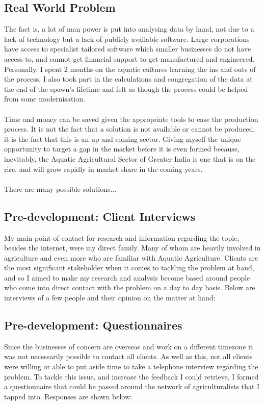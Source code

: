 \documentclass[a4paper,11pt]{proc}
\begin{document}
\subsection{Real World Problem}
The fact is, a lot of man power is put into analysing data by hand, not due to a lack of technology but a lack of publicly available software. Large corporations have access to specialist tailored software which smaller businesses do not have access to, and cannot get financial support to get manufactured and engineered. Personally, I spent 2 months on the aquatic cultures learning the ins and outs of the process, I also took part in the calculations and congregation of the data at the end of the spawn's lifetime and felt as though the process could be helped from some modernisation.\\
\\ Time and money can be saved given the appropriate tools to ease the production process. It is not the fact that a solution is not available or cannot be produced, it is the fact that this is an up and coming sector. Giving myself the unique opportunity to target a gap in the market before it is even formed because, inevitably, the Aquatic Agricultural Sector of Greater India is one that is on the rise, and will grow rapidly in market share in the coming years.\\
\\There are many possible solutions...

\subsection{Pre-development:  Client Interviews}
My main point of contact for research and information regarding the topic, besides the internet, were my direct family. Many of whom are heavily involved in agriculture and even more who are familiar with Aquatic Agriculture. Clients are the most significant stakeholder when it comes to tackling the problem at hand, and so I aimed to make my research and analysis become based around people who come into direct contact with the problem on a day to day basis. Below are interviews of a few people and their opinion on the matter at hand:
\subsection{Pre-development:  Questionnaires}
Since the businesses of concern are overseas and work on a different timezone it was not necessarily possible to contact all clients. As well as this, not all clients were willing or able to put aside time to take a telephone interview regarding the problem. To tackle this issue, and increase the feedback I could retrieve, I formed a questionnaire that could be passed around the network of agriculturalists that I tapped into. Responses are shown below:
\end{document}
